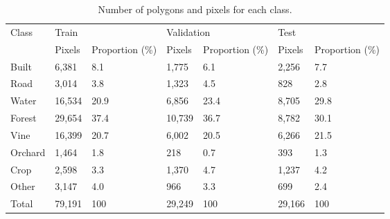 \begin{table}[]
  \begin{tabular}{lllllll}
  \hline
  Class   & \multicolumn{2}{l}{Train} & \multicolumn{2}{l}{Validation} & \multicolumn{2}{l}{Test} \\ \cline{2-7} 
          & Pixels  & Proportion (\%) & Pixels    & Proportion (\%)    & Pixels & Proportion (\%) \\ \hline
  Built   & 6,381   & 8.1             & 1,775     & 6.1                & 2,256  & 7.7             \\
  Road    & 3,014   & 3.8             & 1,323     & 4.5                & 828    & 2.8             \\
  Water   & 16,534  & 20.9            & 6,856     & 23.4               & 8,705  & 29.8            \\
  Forest  & 29,654  & 37.4            & 10,739    & 36.7               & 8,782  & 30.1            \\
  Vine    & 16,399  & 20.7            & 6,002     & 20.5               & 6,266  & 21.5            \\
  Orchard & 1,464   & 1.8             & 218       & 0.7                & 393    & 1.3             \\
  Crop    & 2,598   & 3.3             & 1,370     & 4.7                & 1,237  & 4.2             \\
  Other   & 3,147   & 4.0             & 966       & 3.3                & 699    & 2.4             \\ \hline
  Total   & 79,191  & 100             & 29,249    & 100                & 29,166 & 100            
  \end{tabular}
  \caption{Number of polygons and pixels for each class.}
\end{table}

